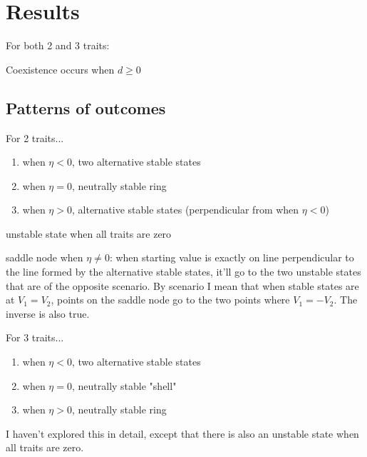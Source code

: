 \section*{Results}



For both 2 and 3 traits:

Coexistence occurs when $d \ge 0$

\subsection*{Patterns of outcomes}

For 2 traits...

\begin{enumerate}
    \item when $\eta < 0$, two alternative stable states
    \item when $\eta = 0$, neutrally stable ring
    \item when $\eta > 0$, alternative stable states (perpendicular from when $\eta < 0$)
\end{enumerate}

unstable state when all traits are zero

saddle node when $\eta \ne 0$:
when starting value is exactly on line perpendicular to
the line formed by the alternative stable states, it'll go to the
two unstable states that are of the opposite scenario.
By scenario I mean that when stable states are at $V_1 = V_2$,
points on the saddle node go to the two points where $V_1 = -V_2$.
The inverse is also true.


For 3 traits...

\begin{enumerate}
    \item when $\eta < 0$, two alternative stable states
    \item when $\eta = 0$, neutrally stable "shell"
    \item when $\eta > 0$, neutrally stable ring
\end{enumerate}

I haven't explored this in detail, except that there is also
an unstable state when all traits are zero.
